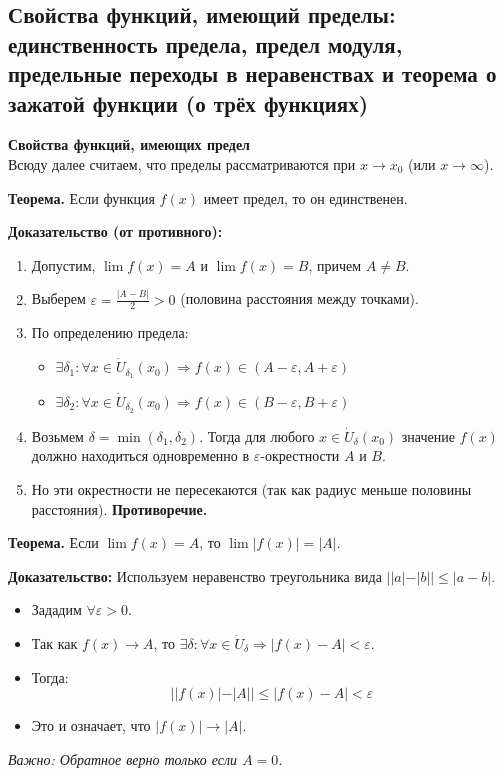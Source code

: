 \subsection{Свойства функций, имеющий пределы: единственность предела, предел модуля, предельные переходы в неравенствах и теорема о зажатой функции (о трёх функциях)}

\textbf{Свойства функций, имеющих предел}\\
Всюду далее считаем, что пределы рассматриваются при $x \to x_0$ (или $x \to \infty$).

\begin{tcolorbox}[title=1. Единственность предела]
	\textbf{Теорема.} Если функция $f(x)$ имеет предел, то он единственен.
	
	\textbf{Доказательство (от противного):}
	\begin{enumerate}
		\item Допустим, $\lim f(x) = A$ и $\lim f(x) = B$, причем $A \neq B$.
		\item Выберем $\varepsilon = \frac{|A - B|}{2} > 0$ (половина расстояния между точками).
		\item По определению предела:
		\begin{itemize}
			\item $\exists \delta_1: \forall x \in \dot{U}_{\delta_1}(x_0) \Rightarrow f(x) \in (A-\varepsilon, A+\varepsilon)$
			\item $\exists \delta_2: \forall x \in \dot{U}_{\delta_2}(x_0) \Rightarrow f(x) \in (B-\varepsilon, B+\varepsilon)$
		\end{itemize}
		\item Возьмем $\delta = \min(\delta_1, \delta_2)$. Тогда для любого $x \in \dot{U}_\delta(x_0)$ значение $f(x)$ должно находиться одновременно в $\varepsilon$-окрестности $A$ и $B$.
		\item Но эти окрестности не пересекаются (так как радиус меньше половины расстояния). \textbf{Противоречие.}
	\end{enumerate}
\end{tcolorbox}

\begin{tcolorbox}[title=2. Предел модуля]
	\textbf{Теорема.} Если $\lim f(x) = A$, то $\lim |f(x)| = |A|$.
	
	\textbf{Доказательство:}
	Используем неравенство треугольника вида $| |a| - |b| | \leq |a - b|$.
	\begin{itemize}
		\item Зададим $\forall \varepsilon > 0$.
		\item Так как $f(x) \to A$, то $\exists \delta: \forall x \in \dot{U}_\delta \Rightarrow |f(x) - A| < \varepsilon$.
		\item Тогда:
		$$ ||f(x)| - |A|| \leq |f(x) - A| < \varepsilon $$
		\item Это и означает, что $|f(x)| \to |A|$.
	\end{itemize}
	\textit{Важно: Обратное верно только если $A=0$.}
\end{tcolorbox}

